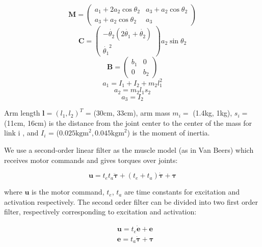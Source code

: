 \begin{equation}
	\bm{M} = \left( \begin{matrix} a_1 + 2a_2\cos\theta_2  &  a_3 + a_2 \cos\theta_2 \\
										a_3 + a_2 \cos\theta_2   &  a_3
				\end{matrix}\right)
\end{equation}
\begin{equation}
	\bm{C} = \left( \begin{matrix} -\dot{\theta_2}(2\dot{\theta_1}+\dot{\theta_2}) \\
										\dot{\theta_1}^2	\end{matrix} \right)
				a_2\sin{\theta_2}
\end{equation}
\begin{equation}
	\bm{B} = \left( \begin{matrix} b_1  & 0 \\ 0 & b_2 \end{matrix} \right)
\end{equation}
\begin{equation}
a_1 = I_1 + I_2 + m_2 l_1^2
\end{equation}
\begin{equation}
a_2 = m_2 l_1 s_2
\end{equation}
\begin{equation}
a_3 = I_2
\end{equation}

Arm length $\bm{l} = (l_1, l_2)^T$ = (30cm, 33cm), arm mass $m_i =$ (1.4kg, 1kg), $s_i=$ (11cm, 16cm) is the distance from the joint center to the center of the mass for link i , and $I_i$ = ($0.025\text{kgm}^2, 0.045\text{kgm}^2$) is the moment of inertia.

We use a second-order linear filter as the muscle model (as in Van Beers) which receives motor commands and gives torques over joints:

\begin{equation}
	\bm{u} = t_et_a\ddot{\bm{\tau}} + (t_e+t_a)\dot{\bm{\tau}} +\bm{\tau}
\end{equation}

where $\bm{u}$ is the motor command, $t_e$, $t_a$ are time constants for excitation and activation respectively. 
The second order filter can be divided into two first order filter, respectively corresponding to excitation and activation:

\begin{equation}
	\begin{split}
	& \bm{u} = t_e \dot{\bm{e}} + \bm{e} \\
	& \bm{e} = t_a \dot{\bm{\tau}} + \bm{\tau}
	\end{split}
\end{equation}

